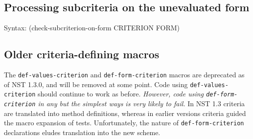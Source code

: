 % 
% 

\subsection{Processing subcriteria on the unevaluated form}
\label{sec:subcriteria-form}
{\ttfamily\begin{tabbing}
\textrm{Syntax: }(check-subcriterion-on-form CRITERION FORM)
\end{tabbing}}%

\subsection{Older criteria-defining macros}
\label{sec:def-values-criterion}
\label{sec:def-form-criterion}
The \texttt{def-values-criterion} and \texttt{def-form-criterion}
macros are deprecated as of NST 1.3.0, and will be removed at some
point.  Code using \texttt{def-values- criterion} should continue to
work as before.  \emph{However, code using \texttt{def-form-
    criterion} in any but the simplest ways is very likely to fail.}
%
In NST 1.3 criteria are translated into method definitions, whereas in
earlier versions criteria guided the macro expansion of tests.
Unfortunately, the nature of \texttt{def-form-criterion} declarations
eludes translation into the new scheme.%

